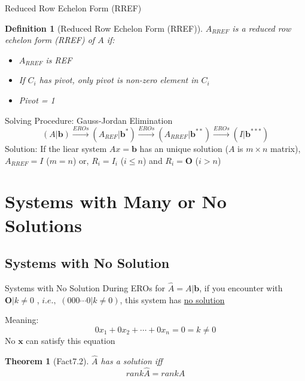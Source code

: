 \documentclass[final]{beamer}
\newtheorem{defn}{Definition}
\newtheorem{thm}{Theorem}
\begin{document}
\begin{frame}[t]{Reduced Row Echelon Form (RREF)}
	\begin{defn}
		[Reduced Row Echelon Form (RREF)]
		$A_{RREF}$ is a reduced row echelon form (RREF) of $A$ if:
		\begin{itemize}
			\item $A_{RREF}$ is REF
			\item If $C_i$ has pivot, only pivot is non-zero element in $C_i$
			\item Pivot = 1
		\end{itemize}
	\end{defn}
	\begin{block}
		{Solving Procedure: Gauss-Jordan Elimination}
		\[
			(A\vert \mathbf{b}) \xrightarrow{EROs} (A_{REF}\vert \mathbf{b}^\ast) \xrightarrow{EROs} (A_{RREF}\vert \mathbf{b}^{\ast\ast}) \xrightarrow{EROs} (I|\mathbf{b}^{\ast\ast\ast})
		\]
		Solution: If the liear system $Ax=\mathbf{b}$ has an unique solution ($A$ is $m\times n$ matrix), $A_{RREF}=I$ ($m=n$) or, $R_i = I_i$ ($i\le n$) and $R_i = \mathbf{O} $ ($i>n$)
	\end{block}
\end{frame}
\section{Systems with Many or No Solutions} %
\label{sec:systems_with_many_or_no_solutions}
\subsection{Systems with No Solution} %
\label{sub:systems_with_no_solution}
\begin{frame}[t]{Systems with No Solution}
	During EROs for $\hat A = A\vert \mathbf{b}$, if you encounter with $ \mathbf{O}\vert k\neq 0$ , $i.e.,$ $(0 0 0\cdots 0\vert k\neq 0)$, this system has \uline{no solution} 
	
	Meaning: \[
		0 x_1 + 0 x_2 + \cdots + 0 x_n = 0 = k \neq 0 \tag{contradiction!}
	\]
	No $\mathbf{x}$ can satisfy this equation
	\begin{thm}
		[Fact7.2]
		$\hat A$ has a solution iff \[
			rank \hat A = rank A
		\]
	\end{thm}
\end{frame}
\end{document}
